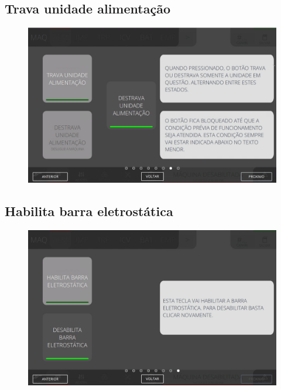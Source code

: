\newpage
\thispagestyle{fancy}
\vspace*{40 pt}
\subsection{Trava unidade alimentação}
\vspace*{\fill}
\begin{figure}[h]
    \centering
    \includegraphics[width=576 px,height=360 px]{src/imagesICV/03-feeder/commands/8.png}
\end{figure}
\vspace*{\fill}

\newpage
\thispagestyle{fancy}
\vspace*{40 pt}
\subsection{Habilita barra eletrostática}
\vspace*{\fill}
\begin{figure}[h]
    \centering
    \includegraphics[width=576 px,height=360 px]{src/imagesICV/03-feeder/commands/9.png}
\end{figure}
\vspace*{\fill}